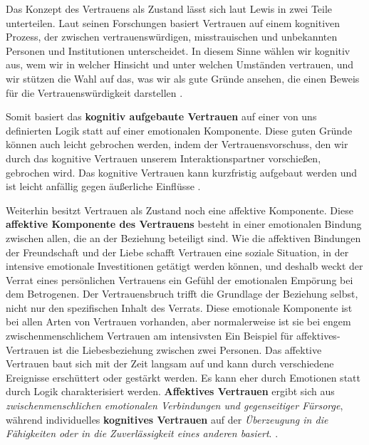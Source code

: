 \documentclass[a4paper,11pt]{article}%
\renewcommand{\\}{\vspace*{0.5\baselineskip} \newline}
\begin{document}

Das Konzept des Vertrauens als Zustand lässt sich laut Lewis \citep[p.970-971]{lewis1985trust} in zwei Teile unterteilen.\newline
Laut seinen Forschungen basiert Vertrauen \dq{}auf einem kognitiven Prozess, der zwischen vertrauenswürdigen, misstrauischen und unbekannten Personen und Institutionen unterscheidet. In diesem Sinne wählen wir kognitiv aus, wem wir in welcher Hinsicht und unter welchen Umständen vertrauen, und wir stützen die Wahl auf das, was wir als \dq{}gute Gründe\dq{} ansehen, die einen Beweis für die Vertrauenswürdigkeit darstellen\dq{} \citep[p.970]{lewis1985trust}.

Somit basiert das \textbf{kognitiv aufgebaute Vertrauen} auf einer von uns definierten Logik statt auf einer emotionalen Komponente. Diese \dq{}guten Gründe\dq{} können auch leicht gebrochen werden, indem der Vertrauensvorschuss, den wir durch das kognitive Vertrauen unserem Interaktionspartner vorschießen, gebrochen wird.
Das kognitive Vertrauen kann kurzfristig aufgebaut werden und ist leicht anfällig gegen äußerliche Einflüsse \citep[p.970]{lewis1985trust}. 

Weiterhin besitzt Vertrauen als \dq{}Zustand\dq{} noch eine affektive Komponente.\\ \dq{}Diese \textbf{affektive Komponente des Vertrauens} besteht in einer emotionalen Bindung zwischen allen, die an der Beziehung beteiligt sind. Wie die affektiven Bindungen der Freundschaft und der Liebe schafft Vertrauen eine soziale Situation, in der intensive emotionale Investitionen getätigt werden können, und deshalb weckt der Verrat eines persönlichen Vertrauens ein Gefühl der emotionalen Empörung bei dem Betrogenen. Der Vertrauensbruch trifft die Grundlage der Beziehung selbst, nicht nur den spezifischen Inhalt des Verrats. Diese emotionale Komponente ist bei allen Arten von Vertrauen vorhanden, aber normalerweise ist sie bei engem zwischenmenschlichem Vertrauen am intensivsten\dq{} \citep[p.971]{lewis1985trust}
\\
Ein Beispiel für affektives-Vertrauen ist die Liebesbeziehung zwischen zwei Personen. Das affektive Vertrauen baut sich mit der Zeit langsam auf und kann durch verschiedene Ereignisse erschüttert oder gestärkt werden. Es kann eher durch Emotionen statt durch Logik charakterisiert werden.
\textbf{Affektives Vertrauen} ergibt sich aus \textit{zwischenmenschlichen emotionalen Verbindungen und gegenseitiger Fürsorge}, während individuelles \textbf{kognitives Vertrauen} auf der \textit{Überzeugung in die Fähigkeiten oder in die Zuverlässigkeit eines anderen basiert}. \citep[p.30]{mcallister1995affect}.
\end{document}
